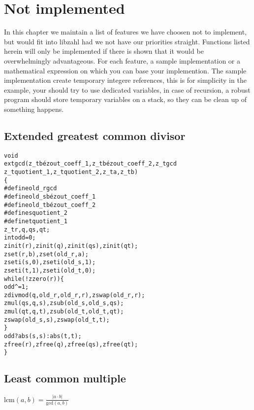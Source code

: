 \chapter{Not implemented}
\label{chap:Not implemented}

In this chapter we maintain a list of
features we have choosen not to implement,
but would fit into libzahl had we not have
our priorities straight. Functions listed
herein will only be implemented if there
is shown that it would be overwhelmingly
advantageous. For each feature, a sample
implementation or a mathematical expression
on which you can base your implemention.
The sample implementation create temporary
integere references, this is for simplicity
in the example, your should try to use
dedicated variables, in case of recursion,
a robust program should store temporary
variables on a stack, so they can be
clean up of something happens.

\vspace{1cm}
\minitoc


\newpage
\section{Extended greatest common divisor}
\label{sec:Extended greatest common divisor}

\begin{alltt}
void
extgcd(z_t bézout_coeff_1, z_t bézout_coeff_2, z_t gcd
       z_t quotient_1, z_t quotient_2, z_t a, z_t b)
\{
#define old_r gcd
#define old_s bézout_coeff_1
#define old_t bézout_coeff_2
#define s quotient_2
#define t quotient_1
    z_t r, q, qs, qt;
    int odd = 0;
    zinit(r), zinit(q), zinit(qs), zinit(qt);
    zset(r, b), zset(old_r, a);
    zseti(s, 0), zseti(old_s, 1);
    zseti(t, 1), zseti(old_t, 0);
    while (!zzero(r)) \{
        odd ^= 1;
        zdivmod(q, old_r, old_r, r), zswap(old_r, r);
        zmul(qs, q, s), zsub(old_s, old_s, qs);
        zmul(qt, q, t), zsub(old_t, old_t, qt);
        zswap(old_s, s), zswap(old_t, t);
    \}
    odd ? abs(s, s) : abs(t, t);
    zfree(r), zfree(q), zfree(qs), zfree(qt);
\}
\end{alltt}


\newpage
\section{Least common multiple}
\label{sec:Least common multiple}

\( \displaystyle{
    \mbox{lcm}(a, b) = \frac{\lvert a \cdot b \rvert}{\mbox{gcd}(a, b)}
}\)


